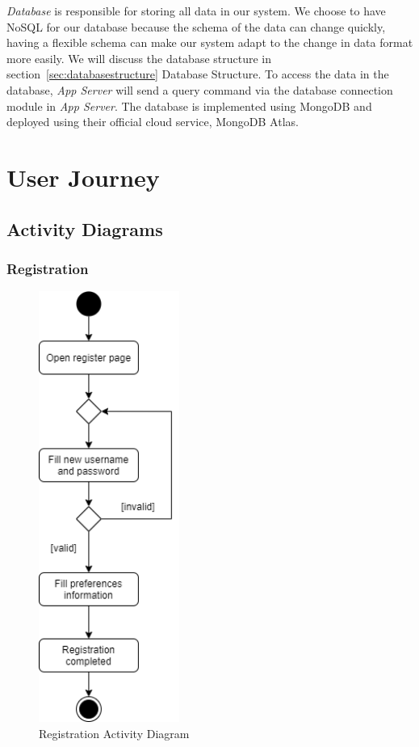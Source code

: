 \documentclass[12pt,oneside,openright,a4paper]{cpe-english-project}
\begin{document}
\textit{Database} is responsible for storing all data in our system. We choose to have NoSQL for our database because the schema of the data can change quickly, having a flexible schema can make our system adapt to the change in data format more easily. We will discuss the database structure in section~\ref{sec:databasestructure} Database Structure. To access the data in the database, \textit{App Server} will send a query command via the database connection module in \textit{App Server}. The database is implemented using MongoDB and deployed using their official cloud service, MongoDB Atlas.


\newpage
\section{User Journey}

\subsection{Activity Diagrams}

\subsubsection{Registration}

\begin{figure}[H]\centering
\includegraphics[height=400pt]{./images/3actdiagram_register.png}
\caption{Registration Activity Diagram}\label{fig:3actdiagram_register}
\end{figure}\vspace{-24pt}
\end{document}
